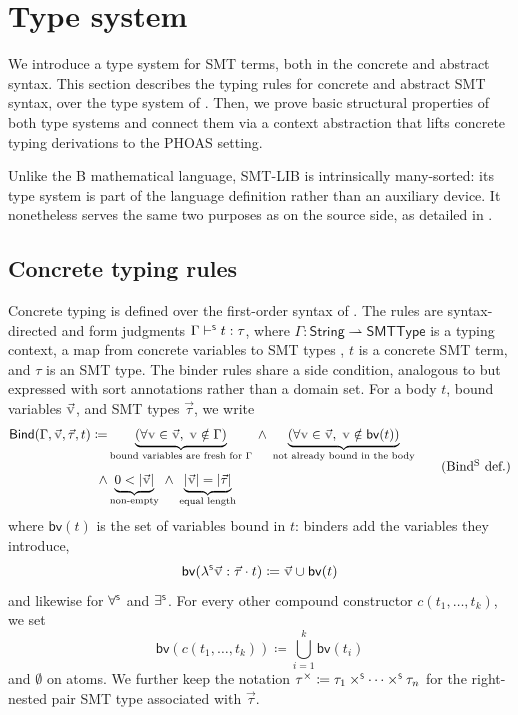 \section{Type system}
\label{sec:smt-typing}

We introduce a type system for SMT terms, both in the concrete and abstract syntax.
This section describes the typing rules for concrete and abstract SMT syntax,
over the type system of .
Then, we prove basic structural properties of both type systems and connect them
via a context abstraction that lifts concrete typing derivations to the PHOAS setting.

Unlike the B mathematical language, SMT-LIB is intrinsically many-sorted: its
type system is part of the language definition rather than an auxiliary device.
It nonetheless serves the same two purposes as on the source side, as detailed in .


\subsection{Concrete typing rules}
\label{subsec:smt-concrete-typing}

Concrete typing is defined over the first-order syntax of
. The rules are syntax-directed and form judgments
\(\Gamma \vdash^{\scriptscriptstyle{\mathsf{S}}} t : \tau\), where \(\Gamma : \mathsf{String} \rightharpoonup \mathsf{SMTType}\) is a
typing context, \ie a map from concrete variables to SMT types ,
\(t\) is a concrete SMT term, and \(\tau\) is an SMT type.
The binder rules share a side condition, analogous to  but expressed with sort
annotations rather than a domain set.
For a body \(t\), bound variables \(\vec{\var{v}}\), and SMT types \(\vec\tau\), we write
\begin{equation}
  \begin{aligned}
    \mathsf{Bind}(\Gamma,\vec{\var{v}},\vec\tau,t) \coloneq
      &\underbrace{(\forall \var{v} \in \vec{\var{v}},\; \var{v} \notin \Gamma)}_{\text{bound variables are fresh for }\Gamma}
      \;\land\; \underbrace{(\forall \var{v} \in \vec{\var{v}},\; \var{v} \notin \mathsf{bv}(t))}_{\text{not already bound in the body}} \\[1ex]
      \land{} &\underbrace{0 < |\vec{\var{v}}|}_{\text{non-empty}}
      \;\land\; \underbrace{|\vec{\var{v}}| = |\vec\tau|}_{\text{equal length}}
  \end{aligned}
  \tag{Bind\textsuperscript{S} def.}
  \label{eq:def-bind-smt}
\end{equation}
where \(\mathsf{bv}(t)\) is the set of variables bound in \(t\): binders add the variables
they introduce, \ie
\[\mathsf{bv}(\lamS \vec{\var{v}} : \vec\tau \cdot t) \coloneq \vec{\var{v}} \cup \mathsf{bv}(t)\]
and likewise for
\(\mathord{\forall^{\scriptscriptstyle{\mathsf{S}}}}\) and \(\mathord{\exists^{\scriptscriptstyle{\mathsf{S}}}}\). For every other compound constructor
\(c(t_1, \ldots, t_k)\), we set
\[\mathsf{bv}(c(t_1, \ldots, t_k)) \coloneq \bigcup_{i=1}^{k}\mathsf{bv}(t_i)\] and
\(\emptyset\) on atoms. We further keep the notation
\(\tau^{\times} \coloneq \tau_1 \mathbin{\times^{\scriptscriptstyle{\mathsf{S}}}} \cdots \mathbin{\times^{\scriptscriptstyle{\mathsf{S}}}} \tau_n\) for the
right-nested pair SMT type associated with \(\vec\tau\).

